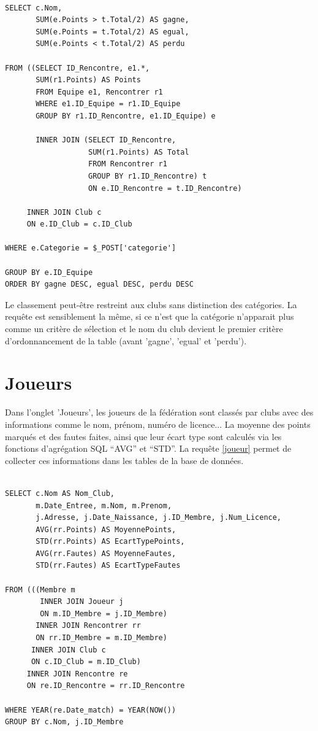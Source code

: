 \documentclass[a4paper»,8pt,french,fleqn]{report}
\begin{document}
\begin{lstlisting}

SELECT c.Nom,
       SUM(e.Points > t.Total/2) AS gagne,
       SUM(e.Points = t.Total/2) AS egual,
       SUM(e.Points < t.Total/2) AS perdu
			
FROM ((SELECT ID_Rencontre, e1.*,
       SUM(r1.Points) AS Points
       FROM Equipe e1, Rencontrer r1
       WHERE e1.ID_Equipe = r1.ID_Equipe
       GROUP BY r1.ID_Rencontre, e1.ID_Equipe) e 
                
       INNER JOIN (SELECT ID_Rencontre,
                   SUM(r1.Points) AS Total
                   FROM Rencontrer r1
                   GROUP BY r1.ID_Rencontre) t
                   ON e.ID_Rencontre = t.ID_Rencontre)
 
     INNER JOIN Club c
     ON e.ID_Club = c.ID_Club
			  
WHERE e.Categorie = $_POST['categorie']

GROUP BY e.ID_Equipe
ORDER BY gagne DESC, egual DESC, perdu DESC

\end{lstlisting}

Le classement peut-être restreint aux clubs sans distinction des catégories. La requête est sensiblement la même, si ce n'est que la catégorie n'apparait plus comme un critère de sélection et le nom du club devient le premier critère d'ordonnancement de la table (avant 'gagne', 'egual' et 'perdu'). 


\section{Joueurs}
Dans l'onglet 'Joueurs', les joueurs de la fédération sont classés par clubs avec des informations comme le nom, prénom, numéro de licence... La moyenne des points marqués et des fautes faites, ainsi que leur écart type sont calculés via les fonctions d'agrégation SQL ``AVG'' et ``STD''. La requête \ref{joueur} permet de collecter ces informations dans les tables de la base de données.

\begin{lstlisting}

SELECT c.Nom AS Nom_Club, 
       m.Date_Entree, m.Nom, m.Prenom, 
       j.Adresse, j.Date_Naissance, j.ID_Membre, j.Num_Licence,
       AVG(rr.Points) AS MoyennePoints,
       STD(rr.Points) AS EcartTypePoints,
       AVG(rr.Fautes) AS MoyenneFautes,
       STD(rr.Fautes) AS EcartTypeFautes

FROM (((Membre m 
        INNER JOIN Joueur j
        ON m.ID_Membre = j.ID_Membre) 
       INNER JOIN Rencontrer rr
       ON rr.ID_Membre = m.ID_Membre)
      INNER JOIN Club c
      ON c.ID_Club = m.ID_Club)
     INNER JOIN Rencontre re
     ON re.ID_Rencontre = rr.ID_Rencontre

WHERE YEAR(re.Date_match) = YEAR(NOW())
GROUP BY c.Nom, j.ID_Membre

\end{lstlisting}
\end{document}
